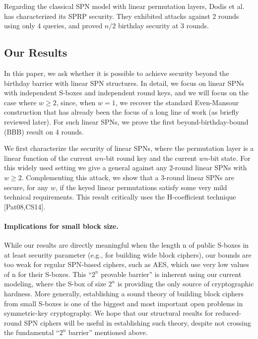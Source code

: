 Regarding the classical SPN model with linear permutation layers, Dodis et al. has characterized its SPRP security.
They exhibited attacks against 2 rounds using only 4 queries, and proved $n/2$ birthday security at 3 rounds.





\subsection{Our Results}


In this paper, we ask whether it is possible to achieve security beyond the birthday barrier with linear SPN structures. In detail, we focus on linear SPNs with independent S-boxes and independent round keys, and we will focus on the case where $w\geq2$, since, when $w = 1$, we recover the standard Even-Mansour construction that has already been the focus
of a long line of work (as briefly reviewed later). For such linear SPNs, we prove the first beyond-birthday-bound (BBB) result on 4 rounds.





We first characterize the security of linear SPNs, where the
permutation layer is a linear function of the current $wn$-bit round key and the current $wn$-bit state. For this widely used setting we give a
general against any 2-round linear SPNs with $w\geq2$. Complementing this
attack, we show that a 3-round linear SPNs are secure, for any $w$, if the keyed linear permutations satisfy some very mild technical requirements. This result critically uses the H-coefficient technique [Pat08,CS14].





\paragraph{Implications for small block size.}

While our results are directly meaningful
when the length n of public S-boxes in at least security parameter (e.g., for
building wide block ciphers), our bounds are too weak for regular SPN-based
ciphers, such as AES, which use very low values of n for their S-boxes.
This ``$2^n$ provable barrier'' is inherent using our current modeling, where the
S-box of size $2^n$ is providing the only source of cryptographic hardness. More
generally, establishing a sound theory of building block ciphers from small S-boxes is one of the biggest and most important open problems in symmetric-key
cryptography. We hope that our structural results for reduced-round SPN ciphers will be useful in establishing such theory, despite not crossing the fundamental ``$2^n$ barrier'' mentioned above.




